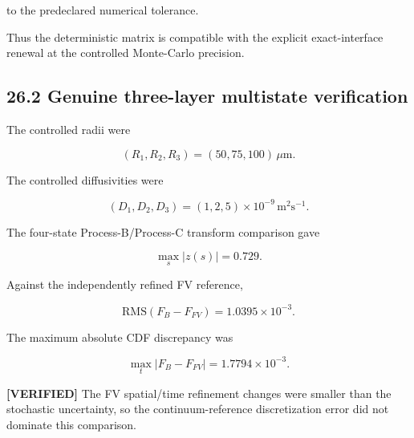 \documentclass[11pt,a4paper]{article}
\begin{document}
to the predeclared numerical tolerance.

Thus the deterministic matrix is compatible with the explicit exact-interface renewal at the controlled Monte-Carlo precision.

\subsection*{26.2 Genuine three-layer multistate verification}

The controlled radii were

\begin{equation}
(R_1,R_2,R_3)
=
(50,75,100)\,\mu\mathrm m.
\tag{TRISO-VER-304}
\label{eq:triso-ver-304}
\end{equation}

The controlled diffusivities were

\begin{equation}
(D_1,D_2,D_3)
=
(1,2,5)\times10^{-9}\,\mathrm{m^2s^{-1}}.
\tag{TRISO-VER-305}
\label{eq:triso-ver-305}
\end{equation}

The four-state Process-B/Process-C transform comparison gave

\begin{equation}
\boxed{
\max_s|z(s)|=0.729.
}
\tag{TRISO-VER-306}
\label{eq:triso-ver-306}
\end{equation}

Against the independently refined FV reference,

\begin{equation}
\boxed{
\mathrm{RMS}(F_B-F_{FV})
=
1.0395\times10^{-3}.
}
\tag{TRISO-VER-307}
\label{eq:triso-ver-307}
\end{equation}

The maximum absolute CDF discrepancy was

\begin{equation}
\boxed{
\max_t|F_B-F_{FV}|
=
1.7794\times10^{-3}.
}
\tag{TRISO-VER-308}
\label{eq:triso-ver-308}
\end{equation}

\textbf{[VERIFIED]} The FV spatial/time refinement changes were smaller than the stochastic uncertainty, so the continuum-reference discretization error did not dominate this comparison.



\end{document}
